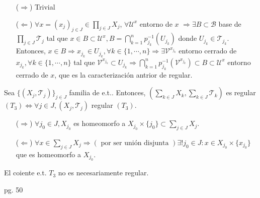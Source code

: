 \begin{dem}
  \begin{enumerate}[label=(\roman*)]
    \item [($\Rightarrow$)] Trivial
    \item [($\Leftarrow$)] $\forall x = ( x_{j} )_{j \in J} \in \prod_{j \in J} X_{j}$, $\forall \mathcal{U}^{x}$ entorno de $x$ $\Rightarrow \exists B \subset \mathcal{B}$ base de $\prod_{j \in J} \mathcal{T}_{j}$ tal que $ x \in B \subset \mathcal{U}^{x}, B = \bigcap_{k=1}^{n} p_{j_{k}}^{-1}(U_{j_{k}})$ donde $U_{j_{k}} \in \mathcal{T}_{j_{k}}$. Entonces, $x \in B \Rightarrow x_{j_{k}} \in U_{j_{k}}, \forall k \in \{ 1, \cdots , n\} \Rightarrow \exists \mathcal{V}^{x_{j_{k}}}$ entorno cerrado de $x_{j_{k}}, \forall k \in \{  1, \cdots, n \}$ tal que $\mathcal{V}^{x_{j_{k}}} \subset U_{j_{k}} \Rightarrow \bigcap_{k = 1}^{n}p_{j_{k}}^{-1} (\mathcal{V}^{x_{j_{k}}}) \subset B \subset \mathcal{U}^{x}$ entorno cerrado de $x$, que es la caracterización antrior de regular.
  \end{enumerate}
\end{dem}

\begin{prop}
  Sea $\{ ( X_{j}, \mathcal{T}_{j} ) \}_{j \in J}$ familia de e.t.. Entonces, $( \sum_{k \in J} X_{k}, \sum_{k \in J} \mathcal{T}_{k})$ es regular $(T_{3}) \Leftrightarrow \forall j \in J, ( X_{j}, \mathcal{T}_{j} )$ regular $(T_{3})$.
\end{prop}

 \begin{dem}
   \begin{enumerate}[label=(\roman*)]
     \item [($\Rightarrow$)] $\forall j_{0} \in J, X_{j_{0}}$ es homeomorfo a $X_{j_{0}} \times \{ j_{0} \} \subset \sum_{ j \in J } X_{j}$.
     \item [($\Leftarrow$)] $\forall x \in \sum_{ j \in J } X_{j} \Rightarrow (\text{ por ser unión disjunta }) \exists! j_{0} \in J: x \in X_{j_{0}} \times \{ x_{j_{0}} \}$ que es homeomorfo a $ X_{j_{0}}$.
   \end{enumerate}
 \end{dem}

 \begin{obs}
   El coiente e.t. $T_{3}$ no es necesariamente regular.
 \end{obs}

 \begin{ejm}
   pg. 50
 \end{ejm}

